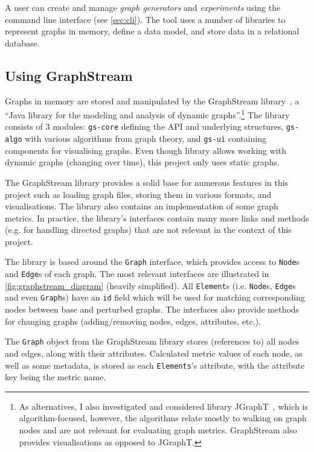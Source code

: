 A user can create and manage \textsl{graph generators} and \textsl{experiments} using the command line interface (see \autoref{sec:cli}).
The \graffs tool uses a number of libraries to represent graphs in memory, define a data model, and store data in a relational database.

\subsection{Using GraphStream}\label{sec:graphstream}

Graphs in memory are stored and manipulated by the GraphStream library~\cite{DutotGraphStreamToolBridging2007}, a \enquote{Java library for the modeling and analysis of dynamic graphs}.\footnote{As alternatives, I also investigated and considered library JGraphT~\cite{Michail2019}, which is algorithm-focused, however, the algorithms relate mostly to walking on graph nodes and are not relevant for evaluating graph metrics.
GraphStream also provides visualisations as opposed to JGraphT.}
The library consists of 3 modules: \texttt{gs-core} defining the API and underlying structures, \texttt{gs-algo} with various algorithms from graph theory, and \texttt{gs-ui} containing components for visualising graphs.
Even though library allows working with dynamic graphs (changing over time), this project only uses static graphs.

The GraphStream library provides a solid base for numerous features in this project such as loading graph files, storing them in various formats, and visualisations.
The library also contains an implementation of some graph metrics.
In practice, the library's interfaces contain many more links and methods (e.g. for handling directed graphs) that are not relevant in the context of this project.



The library is based around the \texttt{Graph} interface, which provides access to \texttt{Node}s and \texttt{Edge}s of each graph.
The most relevant interfaces are illustrated in \autoref{fig:graphstream_diagram} (heavily simplified).
All \texttt{Element}s (i.e. \texttt{Node}s, \texttt{Edge}s and even \texttt{Graph}s) have an \texttt{id} field which will be used for matching corresponding nodes between base and perturbed graphs.
The interfaces also provide methods for changing graphs (adding/removing nodes, edges, attributes, etc.).

The \texttt{Graph} object from the GraphStream library stores (references to) all nodes and edges, along with their attributes.
Calculated metric values of each node, as well as some metadata, is stored as each \texttt{Elements}'s attribute, with the attribute key being the metric name.


